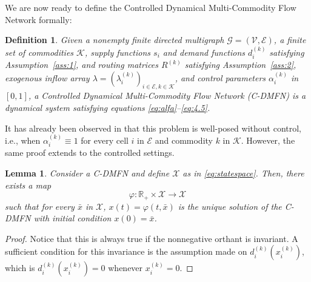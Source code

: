 \documentclass[preprint,12pt]{elsarticle}
\newtheorem{definition}{Definition}
\newtheorem{lemma}{Lemma}
\newcommand{\ben}{\begin{equation*}}
\newcommand{\een}{\end{equation*}}
\newcommand{\mc}{\mathcal}
\newcommand{\R}{\mathbb{R}}
\begin{document}
We are now ready to define the Controlled Dynamical Multi-Commodity Flow Network formally:
\begin{definition}
	Given a nonempty finite directed multigraph $\mathcal{G} = (\mathcal{V},\mathcal{E})$, a finite set of commodities $\mathcal{K}$, supply functions $s_i$ and demand functions $d_i^{(k)}$ satisfying Assumption~\ref{ass:1}, and routing matrices $R^{(k)}$ satisfying Assumption~\ref{ass:2}, exogenous inflow array $\lambda=(\lambda_{i}^{(k)})_{i\in\mc E,k\in\mc K}$, and control parameters $\alpha_i^{(k)}$ in $\left[0,1\right]$, a Controlled Dynamical Multi-Commodity Flow Network (C-DMFN) is a dynamical system satisfying equations \eqref{eq:alfa}--\eqref{eq:4.5}.
\end{definition}
It has already been observed in \cite{Stab_D} that this problem is well-posed without control, i.e., when $\alpha_i^{(k)} \equiv 1$ for every cell $i$ in $\mc E$ and commodity $k$  in  $\mc K$. However, the same proof extends to the controlled settings.
\begin{lemma}
	Consider a C-DMFN and define $\mc{X}$ as in \eqref{eq:statespace}. Then, there exists a map
	\ben
	\varphi : \R_+ \times \mc{X} \rightarrow \mc{X}
	\een
	such that for every $\bar{x}$ in $\mc{X}$, $x(t) = \varphi(t,\bar{x})$ is the unique solution of the C-DMFN with initial condition $x(0) = \bar{x}$.
\end{lemma}
\begin{proof}
	Notice that this is always true if the nonnegative orthant is invariant. A sufficient condition for this invariance is the assumption made on $d_i^{(k)}(x_i^{(k)})$, which is $d_i^{(k)}(x_i^{(k)}) = 0$ whenever $x_i^{(k)} = 0$.
\end{proof}
\end{document}
